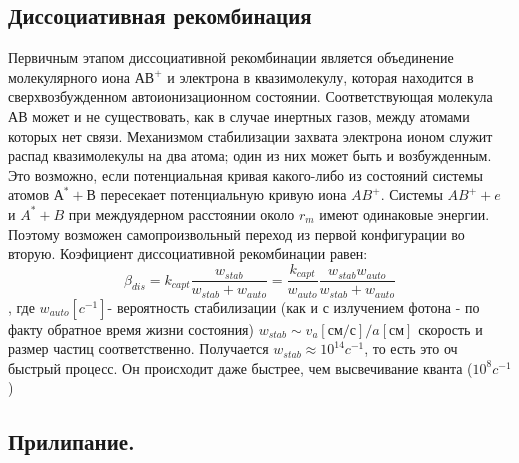 \documentclass[10pt, a4paper]{article}
\begin{document}
\subsection{Диссоциативная рекомбинация}
\label{sec.2.7}
\begin{figure}[h!]
\end{figure}
Первичным этапом диссоциативной рекомбинации является объединение молекулярного иона $АВ^{+}$ и электрона в квазимолекулу, которая находится в сверхвозбужденном автоионизационном состоянии. Соответствующая молекула $АВ$ может и не существовать, как в случае инертных газов, между атомами которых нет связи. Механизмом стабилизации захвата электрона ионом служит распад квазимолекулы на два атома; один из них может быть и возбужденным. Это возможно, если потенциальная кривая какого-либо из состояний системы атомов $А^{*} + В$ пересекает  потенциальную кривую иона $AB^{+}$. 
Системы $AB^{+} + e$ и $A^{*}+B$ при междуядерном расстоянии около $r_m$ имеют одинаковые энергии. Поэтому возможен самопроизвольный переход из первой конфигурации во вторую. 
Коэфициент диссоциативной рекомбинации равен:
\begin{equation}
\beta_{dis}=k_{capt}\frac{w_{stab}}{w_{stab}+w_{auto}}=\frac{k_{capt}}{w_{auto}}\frac{w_{stab}w_{auto}}{w_{stab}+w_{auto}}
\end{equation}
, где  $w_{auto} [c^{-1}]$- вероятность стабилизации (как и с излучением фотона - по факту обратное время жизни состояния) $w_{stab}\sim v_a[см/с] / a[см]$ скорость и размер частиц соответственно. Получается $w_{stab} \approx 10^{14} c^{-1}$, то есть это оч быстрый процесс. Он происходит даже быстрее, чем высвечивание кванта ($10^{8} c^{-1}$ )


\subsection{Прилипание.}
\label{sec.2.8}
\end{document}
